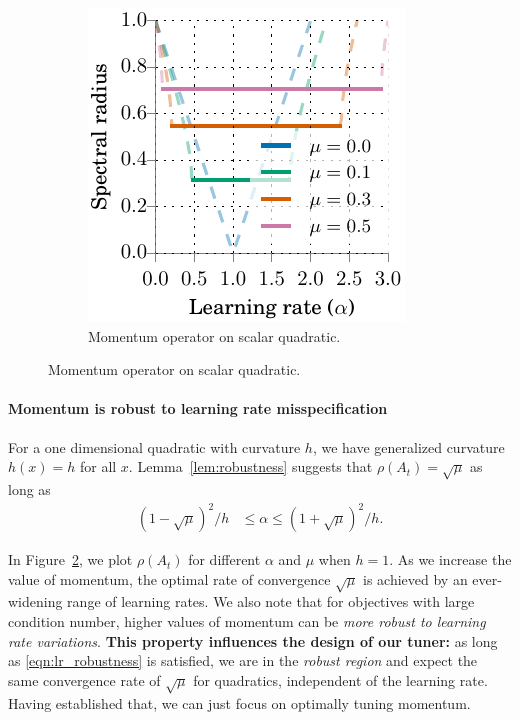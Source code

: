 \documentclass{article} %
\newcommand{\mat}[1]{\bm{\mathit{#1}}}
\begin{document}
\begin{figure}
\vspace{-2.95em}
\begin{minipage}{1.0\linewidth}
\begin{figure}[H]
  \includegraphics[width=0.975\linewidth]{figures/spectral_radii}
  \vspace{-0.75em}
\caption{
Momentum operator on scalar quadratic.
}
\label{fig:lr_robustness}
\end{figure}
\end{minipage}
\end{figure}
\vspace{-0.5em}
\paragraph{Momentum is robust to learning rate misspecification}
\label{sec:lr_robustness}
For a one dimensional quadratic with curvature $h$,
we have generalized curvature $h(x)=h$ for all $x$. Lemma~\ref{lem:robustness} suggests that $\rho(\mat{A}_t)=\sqrt{\mu}$ as long as
\begin{align}
{(1-\sqrt{\mu})^2/h} &\leq \alpha \leq {(1+\sqrt{\mu})^2/h}.
\label{eqn:lr_robustness}
\end{align}

In Figure~\ref{fig:lr_robustness}, we plot $\rho(\mat{A}_t)$ for different $\alpha$ and $\mu$ when $h\!=\!1$.
As we increase the value of momentum, the optimal rate of convergence $\sqrt{\mu}$ is achieved by an ever-widening range of learning rates. 
We also note that for objectives with large condition number, higher values of momentum can be {\em more robust to learning rate variations}.
{\bf This property influences the design of our tuner:} as long as \eqref{eqn:lr_robustness} is satisfied, we are in the {\em robust region} and 
expect the same convergence rate of $\sqrt{\mu}$ for quadratics, independent of the learning rate.
Having established that, we can just focus on optimally tuning momentum.
\end{document}
